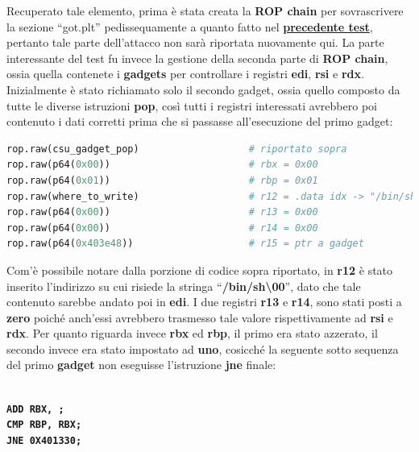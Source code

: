 Recuperato tale elemento, prima è stata creata la \textbf{ROP chain} per sovrascrivere la sezione ``got.plt'' pedissequamente a quanto fatto nel \hyperref[change username]{\textbf{precedente test}}, pertanto tale parte dell'attacco non sarà riportata nuovamente qui.
La parte interessante del test fu invece la gestione della seconda parte di \textbf{ROP chain}, ossia quella contenete i \textbf{gadgets} per controllare i registri \textbf{edi}, \textbf{rsi} e \textbf{rdx}.\\
Inizialmente è stato richiamato solo il secondo gadget, ossia quello composto da tutte le diverse istruzioni \textbf{pop}, così tutti i registri interessati avrebbero poi contenuto i dati corretti prima che si passasse all'esecuzione del primo gadget:
\begin{lstlisting}[language=Python, label=rop1-csu, caption={Prima sequenza della \textbf{ROP chain} che sfrutta il secondo gadget trovato in \textbf{\_\_libc\_csu\_init}().}, style =Python]
rop.raw(csu_gadget_pop)                   # riportato sopra
rop.raw(p64(0x00))                        # rbx = 0x00
rop.raw(p64(0x01))                        # rbp = 0x01
rop.raw(where_to_write)                   # r12 = .data idx -> "/bin/sh\x00"
rop.raw(p64(0x00))                        # r13 = 0x00
rop.raw(p64(0x00))                        # r14 = 0x00
rop.raw(p64(0x403e48))                    # r15 = ptr a gadget 
\end{lstlisting}
Com'è possibile notare dalla porzione di codice sopra riportato, in \textbf{r12} è stato inserito l'indirizzo su cui risiede la stringa ``\textbf{/bin/sh\textbackslash00}'', dato che tale contenuto sarebbe andato poi in \textbf{edi}. I due registri \textbf{r13} e \textbf{r14}, sono stati posti 
a \textbf{zero} poiché anch'essi avrebbero trasmesso tale valore rispettivamente ad \textbf{rsi} e \textbf{rdx}. 
Per quanto riguarda invece \textbf{rbx} ed \textbf{rbp}, il primo era stato azzerato, il secondo invece era stato impostato ad \textbf{uno}, cosicché la seguente sotto sequenza del primo \textbf{gadget} non eseguisse l'istruzione \textbf{jne} finale:\\\\
\begin{text}
\noindent
\hspace*{5.6cm}\texttt{\large{\textbf{\textcolor{Bittersweet}{ADD}  \space  RBX, ;}}}\\
\hspace*{5.6cm}\texttt{\large{\textbf{\textcolor{Bittersweet}{CMP}  \space  RBP, \space RBX;}}}\\
\hspace*{5.6cm}\texttt{\large{\textbf{\textcolor{Bittersweet}{JNE}  \space  0X401330;}}}\\\\
\end{text}
